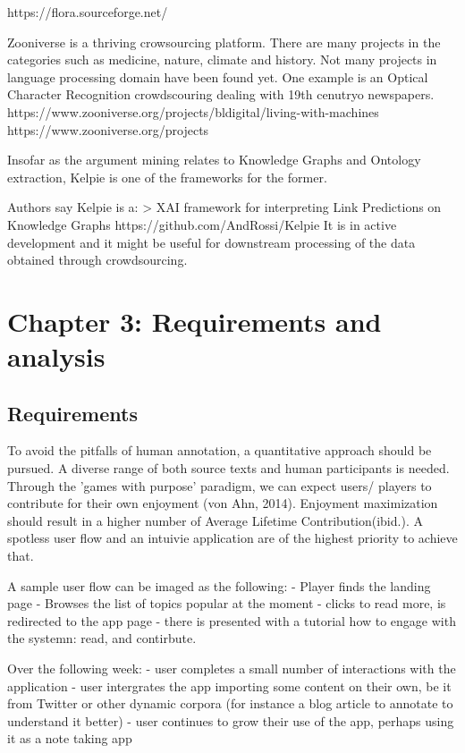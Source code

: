 \documentclass{article}
\begin{document}
https://flora.sourceforge.net/

Zooniverse is a thriving  crowsourcing platform. 
There are many projects in the categories such as medicine, nature, climate and history.
Not many projects in language processing domain have been found yet.
One example is an Optical Character Recognition crowdscouring dealing with 19th cenutryo newspapers.
https://www.zooniverse.org/projects/bldigital/living-with-machines
https://www.zooniverse.org/projects

Insofar as the argument mining relates to Knowledge Graphs and Ontology extraction, Kelpie is one of the frameworks for the former.

Authors say Kelpie is a:
> XAI framework for interpreting Link Predictions on Knowledge Graphs
https://github.com/AndRossi/Kelpie
It is in active development and it might be useful for downstream processing of the data obtained through crowdsourcing.

\section{Chapter 3: Requirements and analysis}

\subsection{Requirements}
To avoid the pitfalls of human annotation, a quantitative approach should be pursued. 
A diverse range of both source texts and human participants is needed.
Through the 'games with purpose' paradigm, we can expect users/ players to contribute for their own enjoyment (von Ahn, 2014).
Enjoyment maximization should result in a higher number of Average Lifetime Contribution(ibid.).
A spotless user flow and an intuivie application are of the highest priority to achieve that.

A sample user flow can be imaged as the following:
- Player finds the landing page
- Browses the list of topics popular at the moment
- clicks to read more, is redirected to the app page
- there is presented with a tutorial how to engage with the systemn: read, and contirbute.

Over the following week:
- user completes a small number of interactions with the application
- user intergrates the app importing some content on their own, be it from Twitter or other dynamic corpora (for instance a blog article to annotate to understand it better)
- user continues to grow their use of the app, perhaps using it as a note taking app
\end{document}
